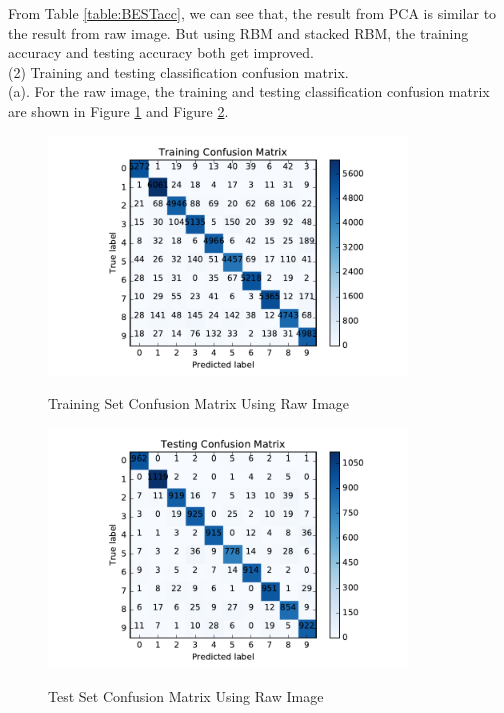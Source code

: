 From Table \ref{table:BESTacc}, we can see that, the result from PCA is similar to the result from raw image. But using RBM and stacked RBM, the training accuracy and testing accuracy both get improved.\\

\noindent (2) Training and testing classification confusion matrix.\\

(a). For the raw image, the training and testing classification confusion matrix are shown in Figure \ref{fig:train_raw} and Figure \ref{fig:test_raw}.

\begin{figure}[H]
\centering
\includegraphics[width=0.85\textwidth]{./figures/train_raw.pdf}\
\caption{\label{fig:train_raw} Training Set Confusion Matrix Using Raw Image}
\end{figure}

\begin{figure}[H]
\centering
\includegraphics[width=0.85\textwidth]{./figures/test_raw.pdf}\
\caption{\label{fig:test_raw} Test Set Confusion Matrix Using Raw Image}
\end{figure}

